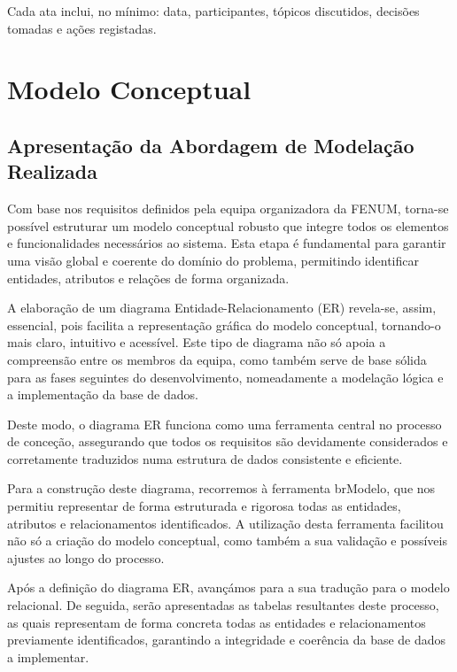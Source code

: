 \documentclass[12pt,a4paper]{article}
\begin{document}
Cada ata inclui, no mínimo: data, participantes, tópicos discutidos, decisões
tomadas e ações registadas.

\section{Modelo Conceptual}


\subsection{Apresentação da Abordagem de Modelação Realizada}

Com base nos requisitos definidos pela equipa organizadora da FENUM, torna-se possível estruturar um modelo conceptual robusto que integre todos os elementos e funcionalidades necessários ao sistema. Esta etapa é fundamental para garantir uma visão global e coerente do domínio do problema, permitindo identificar entidades, atributos e relações de forma organizada.

A elaboração de um diagrama Entidade-Relacionamento (ER) revela-se, assim, essencial, pois facilita a representação gráfica do modelo conceptual, tornando-o mais claro, intuitivo e acessível. Este tipo de diagrama não só apoia a compreensão entre os membros da equipa, como também serve de base sólida para as fases seguintes do desenvolvimento, nomeadamente a modelação lógica e a implementação da base de dados.

Deste modo, o diagrama ER funciona como uma ferramenta central no processo de conceção, assegurando que todos os requisitos são devidamente considerados e corretamente traduzidos numa estrutura de dados consistente e eficiente.

Para a construção deste diagrama, recorremos à ferramenta brModelo, que nos permitiu representar de forma estruturada e rigorosa todas as entidades, atributos e relacionamentos identificados. A utilização desta ferramenta facilitou não só a criação do modelo conceptual, como também a sua validação e possíveis ajustes ao longo do processo.

Após a definição do diagrama ER, avançámos para a sua tradução para o modelo relacional. De seguida, serão apresentadas as tabelas resultantes deste processo, as quais representam de forma concreta todas as entidades e relacionamentos previamente identificados, garantindo a integridade e coerência da base de dados a implementar.
\end{document}

